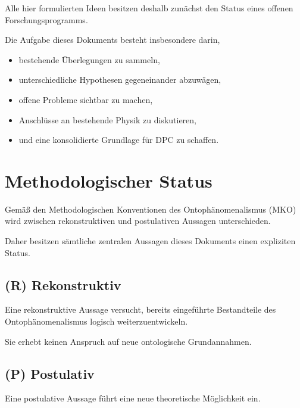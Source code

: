 \documentclass[11pt,a4paper]{article}
\begin{document}
Alle hier formulierten Ideen besitzen deshalb zunächst den
Status eines offenen Forschungsprogramms.

Die Aufgabe dieses Dokuments besteht insbesondere darin,

\begin{itemize}

\item bestehende Überlegungen zu sammeln,

\item unterschiedliche Hypothesen gegeneinander
abzuwägen,

\item offene Probleme sichtbar zu machen,

\item Anschlüsse an bestehende Physik zu diskutieren,

\item und eine konsolidierte Grundlage für DPC zu schaffen.

\end{itemize}

\section{Methodologischer Status}

Gemäß den Methodologischen Konventionen des
Ontophänomenalismus (MKO) wird zwischen rekonstruktiven
und postulativen Aussagen unterschieden.

Daher besitzen sämtliche zentralen Aussagen dieses
Dokuments einen expliziten Status.

\subsection*{(R) Rekonstruktiv}

Eine rekonstruktive Aussage versucht, bereits eingeführte
Bestandteile des Ontophänomenalismus logisch
weiterzuentwickeln.

Sie erhebt keinen Anspruch auf neue ontologische
Grundannahmen.

\subsection*{(P) Postulativ}

Eine postulative Aussage führt eine neue theoretische
Möglichkeit ein.
\end{document}
